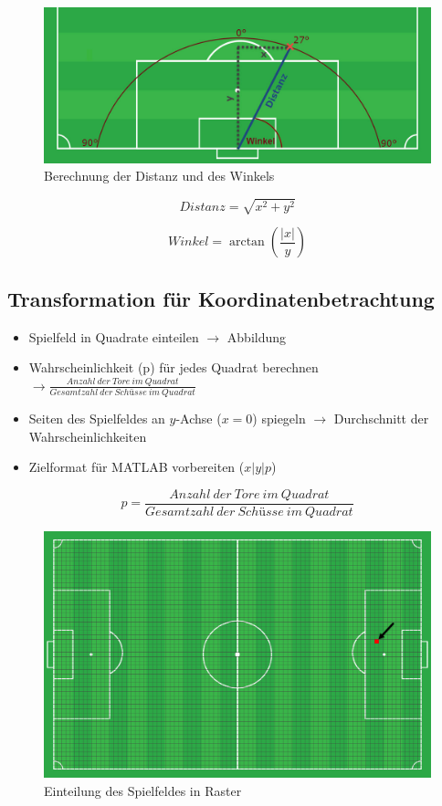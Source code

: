 \begin{figure}[H]
\centering
\includegraphics[scale=0.425]{se-wa-jpg/winkel_distanz}
\caption[Berechnung der Distanz und des Winkels]{Berechnung der Distanz und des Winkels}
\label{transf_pitch}
\end{figure}

\begin{equation}
Distanz= \sqrt{x^2 + y^2}
\end{equation}

\begin{equation}
Winkel= \arctan(\frac{|x|}{y})
\end{equation}

\subsection{Transformation für Koordinatenbetrachtung}
\begin{itemize}
\item Spielfeld in Quadrate einteilen $\rightarrow$ Abbildung
\item Wahrscheinlichkeit (p) für jedes Quadrat berechnen $\rightarrow \frac{Anzahl~der~Tore~im~Quadrat}{Gesamtzahl~der~Schüsse~im~Quadrat}$ 
\item Seiten des Spielfeldes an $y$-Achse ($x=0$) spiegeln $\rightarrow$ Durchschnitt der Wahrscheinlichkeiten
\item Zielformat für MATLAB vorbereiten ($x|y|p$)
\end{itemize}

\begin{equation}
p = \frac{Anzahl~der~Tore~im~Quadrat}{Gesamtzahl~der~Schüsse~im~Quadrat}
\end{equation}

\begin{figure}[H]
\centering
\includegraphics[scale=0.28]{se-wa-jpg/raster}
\caption[Einteilung des Spielfeldes in Raster]{Einteilung des Spielfeldes in Raster}
\label{transf_pitch}
\end{figure}

